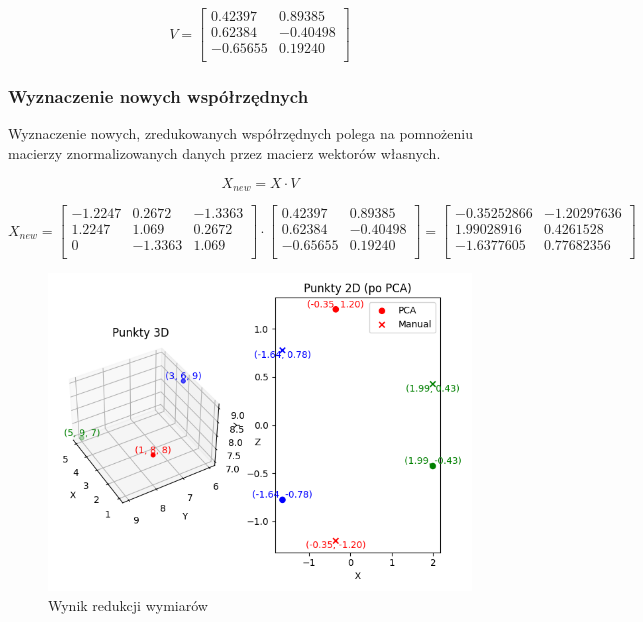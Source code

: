 \documentclass{article}
\begin{document}
\begin{equation*}
    V = 
    \begin{bmatrix}
        0.42397 & 0.89385 \\
        0.62384 & -0.40498 \\
        -0.65655 & 0.19240 \\
    \end{bmatrix}
\end{equation*}

\subsubsection*{Wyznaczenie nowych współrzędnych}

Wyznaczenie nowych, zredukowanych współrzędnych polega na pomnożeniu macierzy
znormalizowanych danych przez macierz wektorów własnych.

\begin{equation}
    X_{new} = X \cdot V
\end{equation}

\begin{equation*}
    X_{new} = 
    \begin{bmatrix}
        -1.2247 & 0.2672 & -1.3363 \\
        1.2247 & 1.069 & 0.2672 \\
        0 & -1.3363 & 1.069 \\
    \end{bmatrix}
    \cdot
    \begin{bmatrix}
        0.42397 & 0.89385 \\
        0.62384 & -0.40498 \\
        -0.65655 & 0.19240  \\
    \end{bmatrix}
    =
    \begin{bmatrix}
        -0.35252866 & -1.20297636 \\
        1.99028916 & 0.4261528 \\
        -1.6377605 & 0.77682356 \\
    \end{bmatrix}
\end{equation*}


\begin{figure}[H]
    \centering
    \includegraphics[width=0.8\linewidth]{Zad2/pca.png}
    \caption{Wynik redukcji wymiarów}
\end{figure}
\end{document}
